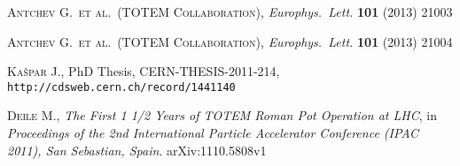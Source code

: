 \documentclass[pdftex,twocolumn,epjc3]{svjour3}
\def\etal{et al.}
\def\Name#1{\textsc{#1}, }
\def\REVIEW#1#2#3#4{{\it #1} {\bf #2} (#3) #4}
\begin{document}
\begin{thebibliography}{99}
	\Name{Antchev G.~\etal{}~(TOTEM Collaboration)}
	\REVIEW{Europhys.~Lett.}{101}{2013}{21003}

	\Name{Antchev G.~\etal{}~(TOTEM Collaboration)}
	\REVIEW{Europhys.~Lett.}{101}{2013}{21004}

	\Name{Ka\v spar J.}
	PhD Thesis, CERN-THESIS-2011-214, {\tt http://cdsweb.cern.ch/record/1441140}

	\Name{Deile M.}
	{\it The First 1 1/2 Years of TOTEM Roman Pot Operation at LHC}, in
	{\it Proceedings of the 2nd International Particle Accelerator Conference (IPAC 2011), San Sebastian, Spain}. 
	arXiv:1110.5808v1



\fi

\end{thebibliography}
\end{document}
